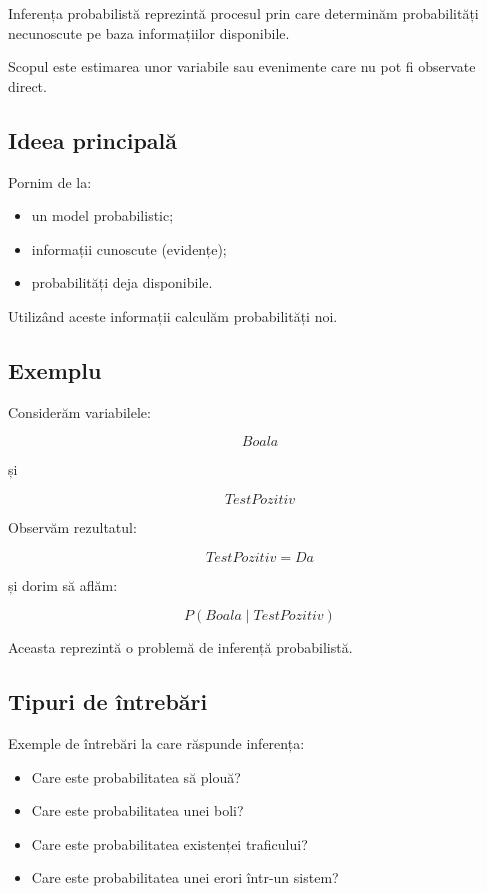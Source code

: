 \documentclass[12pt,a4paper]{article}
\begin{document}
Inferența probabilistă reprezintă procesul prin care determinăm probabilități necunoscute pe baza informațiilor disponibile.

Scopul este estimarea unor variabile sau evenimente care nu pot fi observate direct.

\subsection{Ideea principală}

Pornim de la:

\begin{itemize}
\item un model probabilistic;
\item informații cunoscute (evidențe);
\item probabilități deja disponibile.
\end{itemize}

Utilizând aceste informații calculăm probabilități noi.

\subsection{Exemplu}

Considerăm variabilele:

\[
Boala
\]

și

\[
TestPozitiv
\]

Observăm rezultatul:

\[
TestPozitiv = Da
\]

și dorim să aflăm:

\[
P(Boala \mid TestPozitiv)
\]

Aceasta reprezintă o problemă de inferență probabilistă.

\subsection{Tipuri de întrebări}

Exemple de întrebări la care răspunde inferența:

\begin{itemize}
\item Care este probabilitatea să plouă?
\item Care este probabilitatea unei boli?
\item Care este probabilitatea existenței traficului?
\item Care este probabilitatea unei erori într-un sistem?
\end{itemize}
\end{document}
